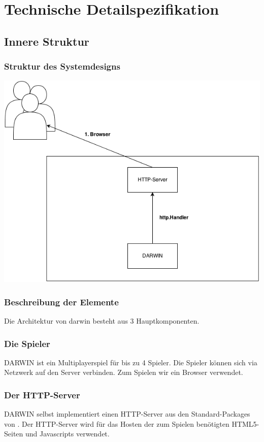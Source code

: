 \section{Technische Detailspezifikation}
\subsection{Innere Struktur}
\subsubsection{Struktur des Systemdesigns}
\includegraphics[width=\linewidth]{simplearch.png}
\subsubsection{Beschreibung der Elemente}
Die Architektur von darwin besteht aus 3 Hauptkomponenten.
\subsubsection{Die Spieler}
DARWIN ist ein Multiplayerspiel für bis zu 4 Spieler. Die Spieler können sich via
Netzwerk auf den Server verbinden. Zum Spielen wir ein Browser verwendet.
\subsubsection{Der HTTP-Server}
DARWIN selbst implementiert einen HTTP-Server aus den Standard-Packages von .
Der HTTP-Server wird für das Hosten der zum Spielen benötigten HTML5-Seiten und
Javascripts verwendet.
